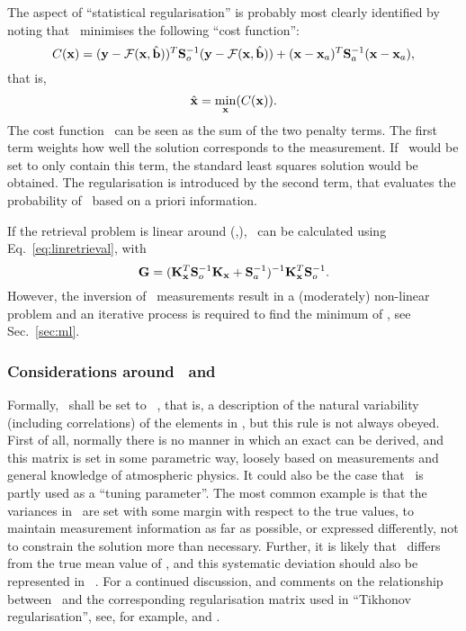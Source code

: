 The aspect of ``statistical regularisation'' is probably most clearly
identified by noting that \OEM\ minimises the following ``cost function'':
\begin{equation}
  \label{eq:costfun}
  C(\mathbf{x}) = (\mathbf{y}-\mathcal{F}(\mathbf{x},\hat{\mathbf{b}}))^T\mathbf{S}_{o}^{-1}
  (\mathbf{y}-\mathcal{F}(\mathbf{x},\hat{\mathbf{b}})) +
  (\mathbf{x}-\mathbf{x}_{a})^T\mathbf{S}_{a}^{-1}(\mathbf{x}-\mathbf{x}_{a}),
\end{equation}
that is,
\begin{equation}
  \label{eq:mincost}
  \hat{\mathbf{x}} = \min\limits_{\mathbf{x}}(C(\mathbf{x})).
\end{equation}
The cost function \CstFnc\ can be seen as the sum of the two penalty terms. The
first term weights how well the solution corresponds to the measurement. If
\CstFnc\ would be set to only contain this term, the standard least squares
solution would be obtained. The regularisation is introduced by the second
term, that evaluates the probability of \SttVct\ based on a priori
information.

If the retrieval problem is linear around (,\FrwMdlVctHat), \RtrVct\
can be calculated using Eq.~\ref{eq:linretrieval}, with
\citep[][Eq.~4.5]{rodgers:00}
\begin{equation}
  \label{eq:lindy}
  \mathbf{G} = (\mathbf{K}_{\mathbf{x}}^T\mathbf{S}_{o}^{-1}\mathbf{K}_{\mathbf{x}}
  +\mathbf{S}_{a}^{-1})^{-1}\mathbf{K}_{\mathbf{x}}^T\mathbf{S}_{o}^{-1}.
\end{equation}
However, the inversion of \smr\ measurements result in a (moderately)
non-linear problem and an iterative process is required to find the minimum of
\CstFnc, see Sec.~\ref{sec:ml}.


\subsubsection{Considerations around \SttVct\ and \FrwMdlVct}
\label{sec:setup:inverse:xb}
%
Formally, \ shall be set to \aCvrMtr{\SttVct}\ \citep{rodgers:00},
that is, a description of the natural variability (including correlations) of
the elements in \SttVct, but this rule is not always obeyed. First of all,
normally there is no manner in which an exact \aCvrMtr{\SttVct} can be derived,
and this matrix is set in some parametric way, loosely based on measurements
and general knowledge of atmospheric physics. It could also be the case that
\ is partly used as a ``tuning parameter''. The most common example
is that the variances in \aCvrMtr{a}\ are set with some margin with respect to
the true values, to maintain measurement information as far as possible, or
expressed differently, not to constrain the solution more than necessary.
Further, it is likely that \aSttVct{a}\ differs from the true mean value of
\SttVct, and this systematic deviation should also be represented in
\ \citep{eriksson:analy:00}. For a continued discussion, and
comments on the relationship between \aCvrMtr{a}\ and the corresponding
regularisation matrix used in ``Tikhonov regularisation'', see, for example,
\citet{eriksson:analy:00} and \citet{ungermann2011tomographic}.


